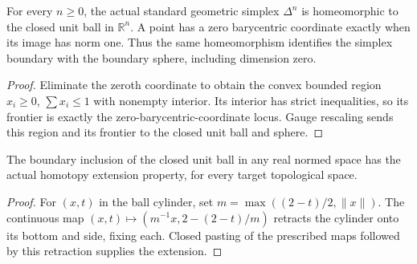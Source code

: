 \begin{proposition}
  \label{prop:geometric-simplex-closed-ball}
  \leanok
  For every $n\geq0$, the actual standard geometric simplex
  $\Delta^n$ is homeomorphic to the closed unit ball in
  $\mathbb R^n$. A point has a zero barycentric coordinate exactly
  when its image has norm one. Thus the same homeomorphism identifies
  the simplex boundary with the boundary sphere, including dimension
  zero.
\end{proposition}
\begin{proof}
  Eliminate the zeroth coordinate to obtain the convex bounded
  region $x_i\geq0$, $\sum x_i\leq1$ with nonempty interior.
  Its interior has strict inequalities, so its frontier is exactly
  the zero-barycentric-coordinate locus. Gauge rescaling sends this
  region and its frontier to the closed unit ball and sphere.
  \leanok
\end{proof}

\begin{proposition}
  \label{prop:ball-boundary-homotopy-extension}
  \leanok
  The boundary inclusion of the closed unit ball in any real normed space has the actual homotopy extension property, for every target topological space.
\end{proposition}
\begin{proof}
  For $(x,t)$ in the ball cylinder, set $m=\max((2-t)/2,\|x\|)$. The continuous map $(x,t)\mapsto(m^{-1}x,2-(2-t)/m)$ retracts the cylinder onto its bottom and side, fixing each. Closed pasting of the prescribed maps followed by this retraction supplies the extension.
  \leanok
\end{proof}

